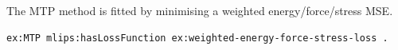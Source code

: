 The MTP method is fitted by minimising a weighted energy/force/stress MSE.
\begin{lstlisting}[language=turtle]
ex:MTP mlips:hasLossFunction ex:weighted-energy-force-stress-loss .
\end{lstlisting}
